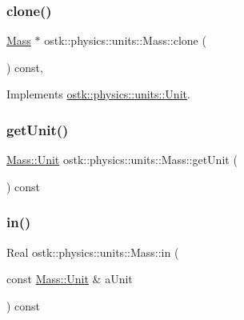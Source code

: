 \subsubsection{\texorpdfstring{clone()}{clone()}}
{\footnotesize\ttfamily \hyperlink{classostk_1_1physics_1_1units_1_1_mass}{Mass} $\ast$ ostk\+::physics\+::units\+::\+Mass\+::clone (\begin{DoxyParamCaption}{ }\end{DoxyParamCaption}) const\hspace{0.3cm}{\ttfamily [override]}, {\ttfamily [virtual]}}



Implements \hyperlink{classostk_1_1physics_1_1units_1_1_unit_ab203628f8a16b16c28d89eaa4c3aff67}{ostk\+::physics\+::units\+::\+Unit}.

\mbox{\label{classostk_1_1physics_1_1units_1_1_mass_a6ac920e7e64b09c39693a0837c070885}} 
\subsubsection{\texorpdfstring{get\+Unit()}{getUnit()}}
{\footnotesize\ttfamily \hyperlink{classostk_1_1physics_1_1units_1_1_mass_aa8994892478fdbe6dc78d4bca08db0fa}{Mass\+::\+Unit} ostk\+::physics\+::units\+::\+Mass\+::get\+Unit (\begin{DoxyParamCaption}{ }\end{DoxyParamCaption}) const}

\mbox{\label{classostk_1_1physics_1_1units_1_1_mass_a4e337ca71db395510a6f6763bc356e9a}} 
\subsubsection{\texorpdfstring{in()}{in()}}
{\footnotesize\ttfamily Real ostk\+::physics\+::units\+::\+Mass\+::in (\begin{DoxyParamCaption}\item[{const \hyperlink{classostk_1_1physics_1_1units_1_1_mass_aa8994892478fdbe6dc78d4bca08db0fa}{Mass\+::\+Unit} \&}]{a\+Unit }\end{DoxyParamCaption}) const}

